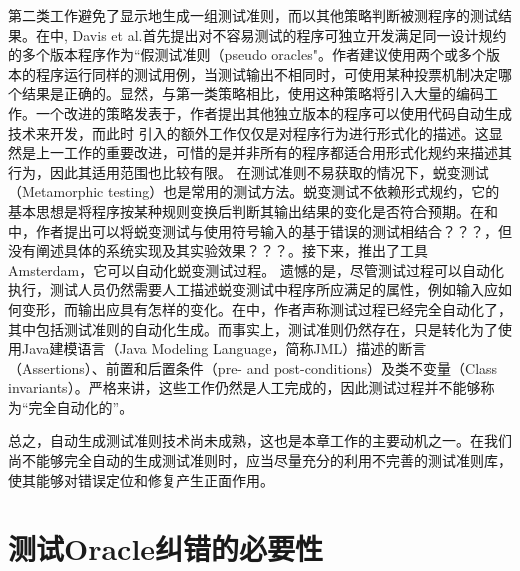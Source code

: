 第二类工作避免了显示地生成一组测试准则，而以其他策略判断被测程序的测试结果。在\cite{Davis:1981:PNP:800175.809889}中, Davis et al.首先提出对不容易测试的程序可独立开发满足同一设计规约的多个版本程序作为“假测试准则（pseudo oracles"。作者建议使用两个或多个版本的程序运行同样的测试用例，当测试输出不相同时，可使用某种投票机制决定哪个结果是正确的。显然，与第一类策略相比，使用这种策略将引入大量的编码工作。一个改进的策略发表于\cite{257793-1992}，作者提出其他独立版本的程序可以使用代码自动生成技术来开发，而此时
引入的额外工作仅仅是对程序行为进行形式化的描述。这显然是上一工作的重要改进，可惜的是并非所有的程序都适合用形式化规约来描述其行为，因此其适用范围也比较有限。
在测试准则不易获取的情况下，蜕变测试（Metamorphic testing）也是常用的测试方法。蜕变测试不依赖形式规约，它的基本思想是将程序按某种规则变换后判断其输出结果的变化是否符合预期。在\cite{960614-chen-2001}和\cite{Chen20031}中，作者提出可以将蜕变测试与使用符号输入的基于错误的测试相结合？？？，但没有阐述具体的系统实现及其实验效果？？？。接下来，\cite{murphy2010automatic}\cite{Murphy:2009:AST:1572272.1572295}推出了工具Amsterdam，它可以自动化蜕变测试过程。 遗憾的是，尽管测试过程可以自动化执行，测试人员仍然需要人工描述蜕变测试中程序所应满足的属性，例如输入应如何变形，而输出应具有怎样的变化。在\cite{cheon2005complete}中，作者声称测试过程已经完全自动化了，其中包括测试准则的自动化生成。而事实上，测试准则仍然存在，只是转化为了使用Java建模语言（Java Modeling Language，简称JML）描述的断言（Assertions）、前置和后置条件（pre- and post-conditions）及类不变量（Class invariants）。严格来讲，这些工作仍然是人工完成的，因此测试过程并不能够称为“完全自动化的”。


总之，自动生成测试准则技术尚未成熟，这也是本章工作的主要动机之一。在我们尚不能够完全自动的生成测试准则时，应当尽量充分的利用不完善的测试准则库，使其能够对错误定位和修复产生正面作用。

\section{测试Oracle纠错的必要性}
\label{sec: error impact}

